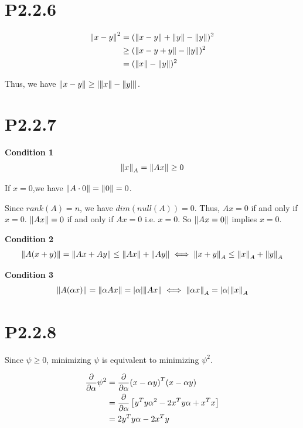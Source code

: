 \documentclass{article}
\begin{document}
\section*{P2.2.6}

\begin{align*}
    \norm{x-y}^2
     & = (\norm{x-y}+\norm{y}-\norm{y})^2 \\
     & \ge (\norm{x-y+y}-\norm{y})^2      \\
     & = (\norm{x}-\norm{y})^2
\end{align*}

Thus, we have $\norm{x-y} \ge |\norm{x}-\norm{y}|$.

\section*{P2.2.7}
\textbf{Condition 1}
\begin{align*}
    \norm{x}_A = \norm{Ax} \ge 0
\end{align*}

If $x=0$,we have $\norm{A\cdot 0}=\norm{0}=0$.

Since $rank(A)=n$, we have $dim(null(A))=0$. Thus, $Ax=0$ if and only if $x=0$.
$\norm{Ax}=0$ if and only if $Ax=0$ i.e. $x=0$. So $\norm{Ax=0}$ implies $x=0$.

\textbf{Condition 2}
\begin{align*}
    \norm{A(x+y)} = \norm{Ax+Ay} \le \norm{Ax}+\norm{Ay} \iff \norm{x+y}_A \le \norm{x}_A+\norm{y}_A
\end{align*}

\textbf{Condition 3}
\begin{align*}
    \norm{A(\alpha x)} = \norm{\alpha Ax} =|\alpha| \norm{Ax} \iff \norm{\alpha x}_A = |\alpha| \norm{x}_A
\end{align*}

\section*{P2.2.8}
Since $\psi \ge 0$, minimizing $\psi$ is equivalent to minimizing $\psi^2$.

\begin{align*}
    \pdv{\alpha}\psi^2
     & = \pdv{\alpha} (x-\alpha y)^T(x-\alpha y)                 \\
     & = \pdv{\alpha} \left[y^Ty\alpha^2-2x^Ty\alpha+x^Tx\right] \\
     & =2y^Ty\alpha-2x^Ty
\end{align*}
\end{document}
